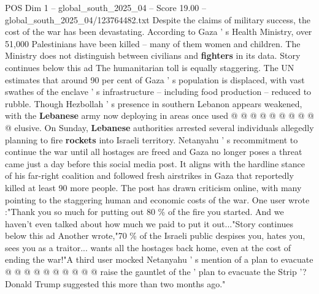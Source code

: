 \begin{textsample}{POS Dim 1 – global\_south\_2025\_04 – Score 19.00 – global\_south\_2025\_04/123764482.txt}
Despite the claims of military success, the cost of the war has been devastating.
According to Gaza ' s Health Ministry, over 51,000 Palestinians have been killed -- many of them women and children.
The Ministry does not distinguish between civilians and \textbf{fighters} in its data.
Story continues below this ad The humanitarian toll is equally staggering.
The UN estimates that around 90 per cent of Gaza ' s population is displaced, with vast swathes of the enclave ' s infrastructure -- including food production -- reduced to rubble.
Though Hezbollah ' s presence in southern Lebanon appears weakened, with the \textbf{Lebanese} army now deploying in areas once used @ @ @ @ @ @ @ @ @ @ elusive.
On Sunday, \textbf{Lebanese} authorities arrested several individuals allegedly planning to fire \textbf{rockets} into Israeli territory.
Netanyahu ' s recommitment to continue the war until all hostages are freed and Gaza no longer poses a threat came just a day before this social media post.
It aligns with the hardline stance of his far-right coalition and followed fresh airstrikes in Gaza that reportedly killed at least 90 more people.
The post has drawn criticism online, with many pointing to the staggering human and economic costs of the war.
One user wrote :"Thank you so much for putting out 80 \% of the fire you started.
And we haven't even talked about how much we paid to put it out..."Story continues below this ad Another wrote,"70 \% of the Israeli public despises you, hates you, sees you as a traitor... wants all the hostages back home, even at the cost of ending the war!"A third user mocked Netanyahu ' s mention of a plan to evacuate @ @ @ @ @ @ @ @ @ @ raise the gauntlet of the ' plan to evacuate the Strip '?
Donald Trump suggested this more than two months ago."

\end{textsample}
